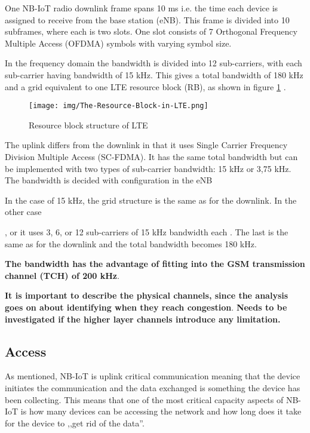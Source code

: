 \documentclass[10pt,a4paper,titlepage,twoside]{article}
\newcommand{\hh}[1]{\textbf{\color{ymaorng} #1}}
\newcommand{\point}[1]{\textbf{\color{ymared} #1}}
\begin{document}
One NB-IoT radio downlink frame spans 10 ms i.e. the time each device is assigned to receive from the base station (eNB). This frame is divided into 10 subframes, where each is two slots. One slot consists of 7 Orthogonal Frequency Multiple Access (OFDMA) symbols with varying symbol size.

In the frequency domain the bandwidth is divided into 12 sub-carriers, with each sub-carrier having bandwidth of 15 kHz. This gives a total bandwidth of 180 kHz and a grid equivalent to one LTE resource block (RB), as shown in figure \ref{fig:lteRb} \cite{schlienz}.

\begin{figure}[h]
  \centering
  \texttt{[image: img/The-Resource-Block-in-LTE.png]}
  \caption{Resource block structure of LTE}
  \label{fig:lteRb}
\end{figure}

The uplink differs from the downlink in that it uses Single Carrier Frequency Division Multiple Access (SC-FDMA). It has the same total bandwidth but can be implemented with two types of sub-carrier bandwidth: 15 kHz or 3,75 kHz. The bandwidth is decided with configuration in the eNB

In the case of 15 kHz, the grid structure is the same as for the downlink. In the other case 


, or it uses 3, 6, or 12 sub-carriers of 15 kHz bandwidth each \cite{3gpp}. The last is the same as for the downlink and the total bandwidth becomes 180 kHz.

\hh{The bandwidth has the advantage of fitting into the GSM transmission channel (TCH) of 200 kHz}.

\hh{It is important to describe the physical channels, since the analysis goes on about identifying when they reach congestion}. \point{Needs to be investigated if the higher layer channels introduce any limitation.}

\subsection{Access}

As mentioned, NB-IoT is uplink critical communication meaning that the device initiates the communication and the data exchanged is something the device has been collecting. This means that one of the most critical capacity aspects of NB-IoT is how many devices can be accessing the network and how long does it take for the device to ,,get rid of the data''.
\end{document}
